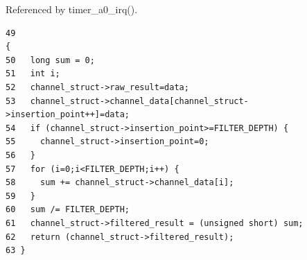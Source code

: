 Referenced by timer\_\-a0\_\-irq().

\footnotesize\begin{verbatim}49                                                                                 {
50   long sum = 0;
51   int i;
52   channel_struct->raw_result=data;
53   channel_struct->channel_data[channel_struct->insertion_point++]=data;
54   if (channel_struct->insertion_point>=FILTER_DEPTH) {
55     channel_struct->insertion_point=0;
56   }
57   for (i=0;i<FILTER_DEPTH;i++) {
58     sum += channel_struct->channel_data[i];
59   }
60   sum /= FILTER_DEPTH;
61   channel_struct->filtered_result = (unsigned short) sum;
62   return (channel_struct->filtered_result);
63 }
\end{verbatim}\normalsize 



